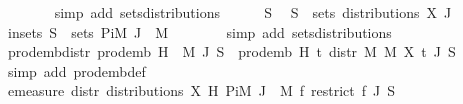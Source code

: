 \begin{isabellebody}
\ \ \ \ \ \ \isamarkupfalse%
\ {\isacharparenleft}{\kern0pt}simp\ add{\isacharcolon}{\kern0pt}\ sets{\isacharunderscore}{\kern0pt}distributions{\isacharparenright}{\kern0pt}\isanewline
\ \ \ \ \isamarkupfalse%
\ S\ \isamarkupfalse%
\ {\isachardoublequoteopen}S\ {\isasymin}\ sets\ {\isacharparenleft}{\kern0pt}distributions\ X\ J{\isacharparenright}{\kern0pt}{\isachardoublequoteclose}\isanewline
\ \ \ \ \isamarkupfalse%
\ \isamarkupfalse%
\ in{\isacharunderscore}{\kern0pt}sets{\isacharcolon}{\kern0pt}\ {\isachardoublequoteopen}S\ {\isasymin}\ sets\ {\isacharparenleft}{\kern0pt}PiM\ J\ {\isacharparenleft}{\kern0pt}{\isasymlambda}{\isacharunderscore}{\kern0pt}{\isachardot}{\kern0pt}\ {\isacharquery}{\kern0pt}M{\isacharprime}{\kern0pt}{\isacharparenright}{\kern0pt}{\isacharparenright}{\kern0pt}{\isachardoublequoteclose}\isanewline
\ \ \ \ \ \ \isamarkupfalse%
\ {\isacharparenleft}{\kern0pt}simp\ add{\isacharcolon}{\kern0pt}\ sets{\isacharunderscore}{\kern0pt}distributions{\isacharparenright}{\kern0pt}\isanewline
\ \ \ \ \isamarkupfalse%
\ prod{\isacharunderscore}{\kern0pt}emb{\isacharunderscore}{\kern0pt}distr{\isacharcolon}{\kern0pt}\ {\isachardoublequoteopen}{\isacharparenleft}{\kern0pt}prod{\isacharunderscore}{\kern0pt}emb\ H\ {\isacharparenleft}{\kern0pt}{\isasymlambda}{\isacharunderscore}{\kern0pt}{\isachardot}{\kern0pt}\ {\isacharquery}{\kern0pt}M{\isacharprime}{\kern0pt}{\isacharparenright}{\kern0pt}\ J\ S{\isacharparenright}{\kern0pt}\ {\isacharequal}{\kern0pt}\ {\isacharparenleft}{\kern0pt}prod{\isacharunderscore}{\kern0pt}emb\ H\ {\isacharparenleft}{\kern0pt}{\isasymlambda}t{\isachardot}{\kern0pt}\ distr\ {\isacharquery}{\kern0pt}M\ {\isacharquery}{\kern0pt}M{\isacharprime}{\kern0pt}\ {\isacharparenleft}{\kern0pt}X\ t{\isacharparenright}{\kern0pt}{\isacharparenright}{\kern0pt}\ J\ S{\isacharparenright}{\kern0pt}{\isachardoublequoteclose}\isanewline
\ \ \ \ \ \ \isamarkupfalse%
\ {\isacharparenleft}{\kern0pt}simp\ add{\isacharcolon}{\kern0pt}\ prod{\isacharunderscore}{\kern0pt}emb{\isacharunderscore}{\kern0pt}def{\isacharparenright}{\kern0pt}\isanewline
\ \ \ \ \isamarkupfalse%
\ {\isachardoublequoteopen}emeasure\ {\isacharparenleft}{\kern0pt}distr\ {\isacharparenleft}{\kern0pt}distributions\ X\ H{\isacharparenright}{\kern0pt}\ {\isacharparenleft}{\kern0pt}Pi\isactrlsub M\ J\ {\isacharparenleft}{\kern0pt}{\isasymlambda}{\isacharunderscore}{\kern0pt}{\isachardot}{\kern0pt}\ {\isacharquery}{\kern0pt}M{\isacharprime}{\kern0pt}{\isacharparenright}{\kern0pt}{\isacharparenright}{\kern0pt}\ {\isacharparenleft}{\kern0pt}{\isasymlambda}f{\isachardot}{\kern0pt}\ restrict\ f\ J{\isacharparenright}{\kern0pt}{\isacharparenright}{\kern0pt}\ S\ {\isacharequal}{\kern0pt}\isanewline

\end{isabellebody}

